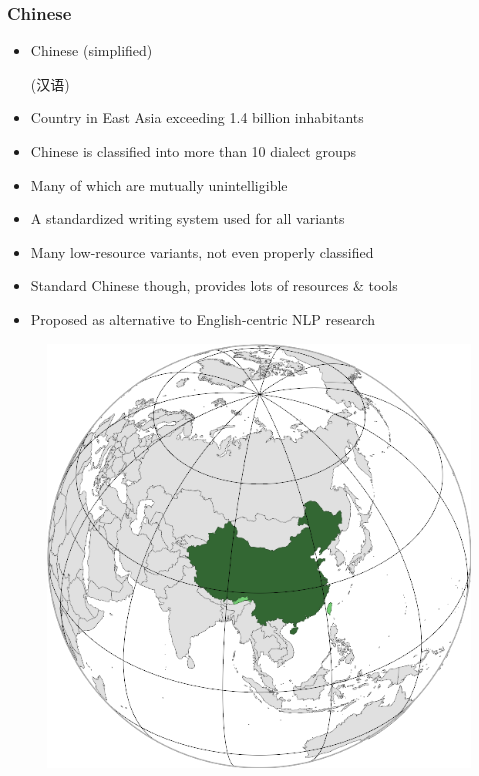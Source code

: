 \documentclass[aspectratio=169]{beamer}
\begin{document}
\begin{frame}[fragile]
	\frametitle{Chinese}
    \begin{minipage}{.70\textwidth}
    \centering
    \begin{itemize}
        \item Chinese (simplified) 
        \begin{CJK*}{UTF8}{gbsn}(汉语)\clearpage\end{CJK*}
        \item Country in East Asia exceeding 1.4 billion inhabitants
        \item Chinese is classified into more than 10 dialect groups
        \item Many of which are mutually unintelligible
        \item A standardized writing system used for all variants
        \item Many low-resource variants, not even properly classified
        \item Standard Chinese though, provides lots of resources \& tools
        \item Proposed as alternative to English-centric NLP research
    \end{itemize}
    \end{minipage}%
    \begin{minipage}{.30\textwidth}
      \begin{figure}
        \centering
        \includegraphics[width=1.0\textwidth]{images/China-Wikipedia-Position.png} 
    \end{figure}
    \end{minipage}


\end{frame}
\end{document}
